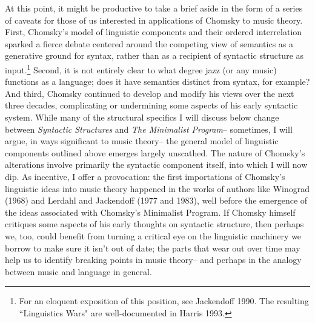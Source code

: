 At this point, it might be productive to take a brief aside in the form of a series of caveats for those of us interested in applications of Chomsky to music theory.  First, Chomsky's model of linguistic components and their ordered interrelation sparked a fierce debate centered around the competing view of semantics as a generative ground for syntax, rather than as a recipient of syntactic structure as input.\footnote{For an eloquent exposition of this position, see Jackendoff 1990.  The resulting ``Linguistics Wars" are well-documented in Harris 1993.}  Second, it is not entirely clear to what degree jazz (or any music) functions as a language; does it have semantics distinct from syntax, for example?  And third, Chomsky continued to develop and modify his views over the next three decades, complicating or undermining some aspects of his early syntactic system.  While many of the structural specifics I will discuss below change between \emph{Syntactic Structures} and \emph{The Minimalist Program}-- sometimes, I will argue, in ways significant to music theory-- the general model of linguistic components outlined above emerges largely unscathed.  The nature of Chomsky's alterations involve primarily the syntactic component itself, into which I will now dip.  As incentive, I offer a provocation: the first importations of Chomsky's linguistic ideas into music theory happened in the works of authors like Winograd (1968) and Lerdahl and Jackendoff (1977 and 1983), well before the emergence of the ideas associated with Chomsky's Minimalist Program.  If Chomsky himself critiques some aspects of his early thoughts on syntactic structure, then perhaps we, too, could benefit from turning a critical eye on the linguistic machinery we borrow to make sure it isn't out of date; the parts that wear out over time may help us to identify breaking points in music theory-- and perhaps in the analogy between music and language in general.

